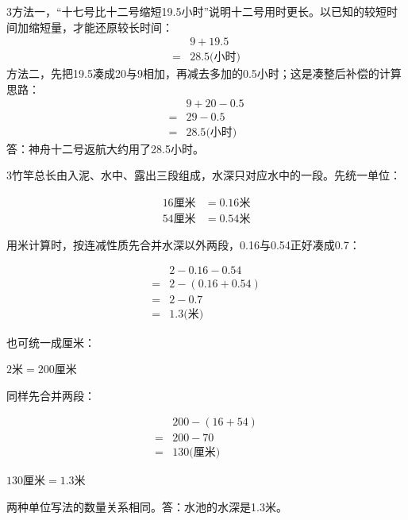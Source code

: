 \documentclass[multi=snippet,border={5bp 20bp 5bp 5bp}]{standalone}
\newenvironment{snippet}[3]{\begin{minipage}{#1bp}\color{answerred}\fontsize{#2}{#3}\selectfont\raggedright}{\end{minipage}}
\begin{document}
\begin{snippet}{505}{11.5}{14}\begin{multicols}{3}\raggedcolumns 方法一，“十七号比十二号缩短19.5小时”说明十二号用时更长。以已知的较短时间加缩短量，才能还原较长时间：\[\begin{aligned}&9+19.5\\={}&28.5\text{(小时)}\end{aligned}\]方法二，先把19.5凑成20与9相加，再减去多加的0.5小时；这是凑整后补偿的计算思路：\[\begin{aligned}&9+20-0.5\\={}&29-0.5\\={}&28.5\text{(小时)}\end{aligned}\]答：神舟十二号返航大约用了28.5小时。\end{multicols}\end{snippet}
\begin{snippet}{505}{11.5}{14}\begin{multicols}{3}\raggedcolumns 竹竿总长由入泥、水中、露出三段组成，水深只对应水中的一段。先统一单位：\par\noindent\[\displaystyle \begin{aligned}16\text{厘米}&=0.16\text{米}\\54\text{厘米}&=0.54\text{米}\end{aligned}\]\par 用米计算时，按连减性质先合并水深以外两段，0.16与0.54正好凑成0.7：\par\noindent\[\displaystyle \begin{aligned}&2-0.16-0.54\\={}&2-(0.16+0.54)\\={}&2-0.7\\={}&1.3\text{(米)}\end{aligned}\]\par 也可统一成厘米：\par\noindent\(\displaystyle 2\text{米}=200\text{厘米}\)\allowbreak \par 同样先合并两段：\par\noindent\[\displaystyle \begin{aligned}&200-(16+54)\\={}&200-70\\={}&130\text{(厘米)}\end{aligned}\]\par \noindent\(\displaystyle 130\text{厘米}=1.3\text{米}\)\allowbreak \par 两种单位写法的数量关系相同。答：水池的水深是1.3米。\end{multicols}\end{snippet}
\end{document}
